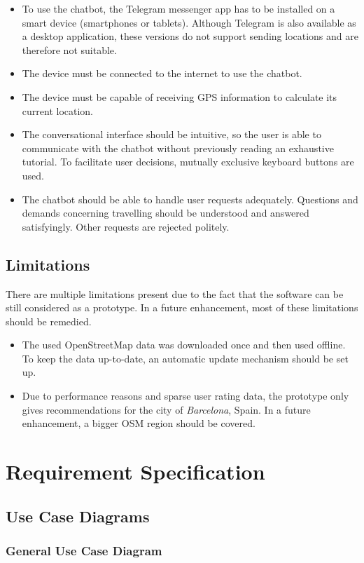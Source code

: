 \begin{itemize}
\item To use the chatbot, the Telegram messenger app has to be installed on a smart device (smartphones or tablets). Although Telegram is also available as a desktop application, these versions do not support sending locations and are therefore not suitable.
\item The device must be connected to the internet to use the chatbot.
\item The device must be capable of receiving GPS information to calculate its current location. 
\item The conversational interface should be intuitive, so the user is able to communicate with the chatbot without previously reading an exhaustive tutorial. To facilitate user decisions, mutually exclusive keyboard buttons are used.
\item The chatbot should be able to handle user requests adequately. Questions and demands concerning travelling should be understood and answered satisfyingly. Other requests are rejected politely.
\end{itemize}

\subsection{Limitations}
There are multiple limitations present due to the fact that the software can be still considered as a prototype. In a future enhancement, most of these limitations should be remedied.
\begin{itemize}
\item The used OpenStreetMap data was downloaded once and then used offline. To keep the data up-to-date, an automatic update mechanism should be set up.
\item Due to performance reasons and sparse user rating data, the prototype only gives recommendations for the city of \textit{Barcelona}, Spain. In a future enhancement, a bigger OSM region should be covered.
\end{itemize}
\pagebreak

\section{Requirement Specification}
\subsection{Use Case Diagrams}
\subsubsection{General Use Case Diagram}

